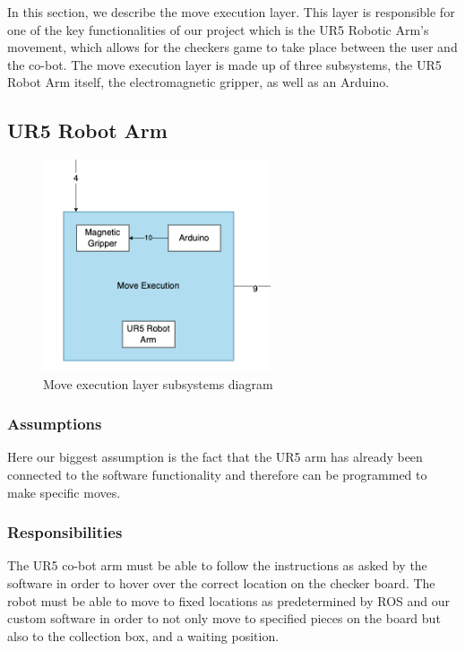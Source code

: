 In this section, we describe the move execution layer. This layer is responsible for one of the key functionalities of our project which is the UR5 Robotic Arm's movement, which allows for the checkers game to take place between the user and the co-bot. The move execution layer is made up of three subsystems, the UR5 Robot Arm itself, the electromagnetic gripper, as well as an Arduino.

\subsection{UR5 Robot Arm}
\begin{figure}[h!]
	\centering
 	\includegraphics[width=0.60\textwidth]{images/move_execution.png}
 \caption{Move execution layer subsystems diagram}
\end{figure}

\subsubsection{Assumptions}
Here our biggest assumption is the fact that the UR5 arm has already been connected to the software functionality and therefore can be programmed to make specific moves.

\subsubsection{Responsibilities}
The UR5 co-bot arm must be able to follow the instructions as asked by the software in order to hover over the correct location on the checker board. The robot must be able to move to fixed locations as predetermined by ROS and our custom software in order to not only move to specified pieces on the board but also to the collection box, and a waiting position.

